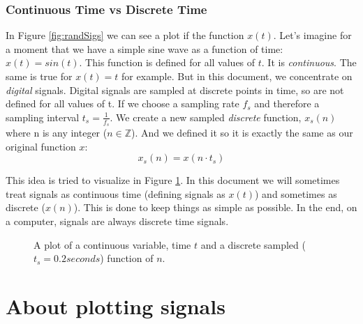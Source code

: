 

\subsubsection*{Continuous Time vs Discrete Time}
In Figure \ref{fig:randSigs} we can see a plot if the function $x(t)$. Let's imagine for a moment that we have a simple sine wave as a function of time: $x(t) = sin(t)$. This function is defined for all values of $t$. It is \textit{continuous}. The same is true for $x(t) = t$ for example. But in this document, we concentrate on \textit{digital} signals. Digital signals are sampled at discrete points in time, so are not defined for all values of t. If we choose a sampling rate $f_s$ and therefore a sampling interval $t_s = \frac{1}{f_s}$. We create a new sampled \textit{discrete} function, $x_s(n)$ where n is any integer ($n \in \mathbb{Z}$). And we defined it so it is exactly the same as our original function $x$:
\begin{equation}
x_s(n) = x(n \cdot t_s)
\end{equation}

This idea is tried to visualize in Figure \ref{fig:sampledSine}. In this document we will sometimes treat signals as continuous time (defining signals as $x(t)$) and sometimes as discrete ($x(n)$). This is done to keep things as simple as possible. In the end, on a computer, signals are always discrete time signals.


\begin{figure}[h!]
	\centering
	
	\caption[sampling]
	{A plot of a continuous variable, time $t$ and a discrete sampled ($t_s=0.2 seconds$) function of $n$.}
	\label{fig:sampledSine}
\end{figure}


\section{About plotting signals}

